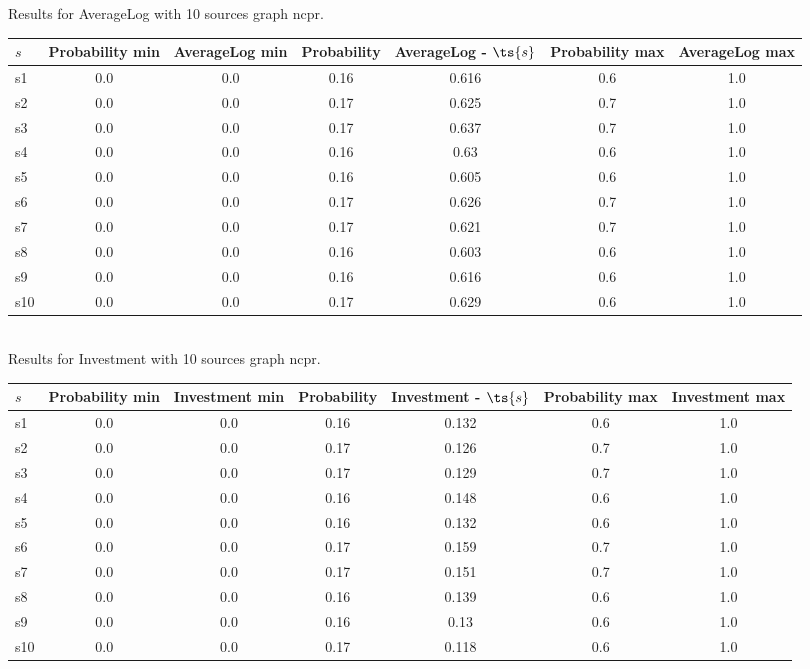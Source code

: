 \documentclass{article}
\begin{document}
\noindent Results for AverageLog with 10 sources graph ncpr.

\noindent\begin{tabular}{|l|c|c|c|c|c|c|}
\hline
$s$& Probability min & AverageLog min & Probability & AverageLog - $\ts{s}$ & Probability max & AverageLog max\\
\hline
s1 &0.0 & 0.0 & 0.16 & 0.616 & 0.6 & 1.0\\
\hline
s2 &0.0 & 0.0 & 0.17 & 0.625 & 0.7 & 1.0\\
\hline
s3 &0.0 & 0.0 & 0.17 & 0.637 & 0.7 & 1.0\\
\hline
s4 &0.0 & 0.0 & 0.16 & 0.63 & 0.6 & 1.0\\
\hline
s5 &0.0 & 0.0 & 0.16 & 0.605 & 0.6 & 1.0\\
\hline
s6 &0.0 & 0.0 & 0.17 & 0.626 & 0.7 & 1.0\\
\hline
s7 &0.0 & 0.0 & 0.17 & 0.621 & 0.7 & 1.0\\
\hline
s8 &0.0 & 0.0 & 0.16 & 0.603 & 0.6 & 1.0\\
\hline
s9 &0.0 & 0.0 & 0.16 & 0.616 & 0.6 & 1.0\\
\hline
s10 &0.0 & 0.0 & 0.17 & 0.629 & 0.6 & 1.0\\
\hline
\end{tabular}\\

\noindent Results for Investment with 10 sources graph ncpr.

\noindent\begin{tabular}{|l|c|c|c|c|c|c|}
\hline
$s$& Probability min & Investment min & Probability & Investment - $\ts{s}$ & Probability max & Investment max\\
\hline
s1 &0.0 & 0.0 & 0.16 & 0.132 & 0.6 & 1.0\\
\hline
s2 &0.0 & 0.0 & 0.17 & 0.126 & 0.7 & 1.0\\
\hline
s3 &0.0 & 0.0 & 0.17 & 0.129 & 0.7 & 1.0\\
\hline
s4 &0.0 & 0.0 & 0.16 & 0.148 & 0.6 & 1.0\\
\hline
s5 &0.0 & 0.0 & 0.16 & 0.132 & 0.6 & 1.0\\
\hline
s6 &0.0 & 0.0 & 0.17 & 0.159 & 0.7 & 1.0\\
\hline
s7 &0.0 & 0.0 & 0.17 & 0.151 & 0.7 & 1.0\\
\hline
s8 &0.0 & 0.0 & 0.16 & 0.139 & 0.6 & 1.0\\
\hline
s9 &0.0 & 0.0 & 0.16 & 0.13 & 0.6 & 1.0\\
\hline
s10 &0.0 & 0.0 & 0.17 & 0.118 & 0.6 & 1.0\\
\hline
\end{tabular}\\
\end{document}
